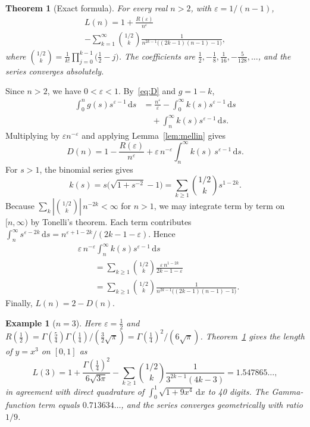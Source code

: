 \documentclass[journal]{IEEEtran}
\newtheorem{theorem}{Theorem}
\newtheorem{example}{Example}
\newcommand{\eps}{\varepsilon}
\newcommand{\dd}{\,\mathrm{d}}
\begin{document}
\begin{theorem}[Exact formula]\label{thm:exact}
For every real $n>2$, with $\eps=1/(n-1)$,
\begin{multline}\label{eq:exact}
  L(n)=1+\frac{R(\eps)}{n^{\eps}}\\
  -\sum_{k=1}^{\infty}\binom{1/2}{k}\frac{1}{n^{2k-1}\bigl((2k-1)(n-1)-1\bigr)},
\end{multline}
where $\binom{1/2}{k}=\frac{1}{k!}\prod_{j=0}^{k-1}\bigl(\frac12-j\bigr)$. The coefficients are
$\frac12,-\frac18,\frac1{16},-\frac5{128},\dots$, and the series converges absolutely.
\end{theorem}

\begin{IEEEproof}
Since $n>2$, we have $0<\eps<1$. By~\eqref{eq:D} and $g=1-k$,
\begin{align*}
  \int_0^ng(s)s^{\eps-1}\dd s&=\frac{n^{\eps}}{\eps}-\int_0^\infty k(s)s^{\eps-1}\dd s\\
  &\quad+\int_n^\infty k(s)s^{\eps-1}\dd s.
\end{align*}
Multiplying by $\eps n^{-\eps}$ and applying Lemma~\ref{lem:mellin} gives
\begin{equation}\label{eq:Dexact}
  D(n)=1-\frac{R(\eps)}{n^{\eps}}+\eps\,n^{-\eps}\int_n^\infty k(s)\,s^{\eps-1}\dd s.
\end{equation}
For $s>1$, the binomial series gives
\[
  k(s)=s\bigl(\sqrt{1+s^{-2}}-1\bigr)=\sum_{k\ge1}\binom{1/2}{k}s^{1-2k}.
\]
Because $\sum_k|\binom{1/2}{k}|\,n^{-2k}<\infty$ for $n>1$, we may integrate term by term on
$[n,\infty)$ by Tonelli's theorem. Each term contributes
$\int_n^\infty s^{\eps-2k}\dd s=n^{\eps+1-2k}/(2k-1-\eps)$. Hence
\begin{align*}
  &\eps\,n^{-\eps}\int_n^\infty k(s)s^{\eps-1}\dd s\\
  &\qquad=\sum_{k\ge1}\binom{1/2}{k}\frac{\eps\,n^{1-2k}}{2k-1-\eps}\\
  &\qquad=\sum_{k\ge1}\binom{1/2}{k}\frac{1}{n^{2k-1}\bigl((2k-1)(n-1)-1\bigr)}.
\end{align*}
Finally, $L(n)=2-D(n)$.
\end{IEEEproof}

\begin{example}[$n=3$]\label{ex:n3}
Here $\eps=\frac12$ and $R(\frac12)=\Gamma(\frac54)\Gamma(\frac14)/(\frac32\sqrt\pi)
=\Gamma(\frac14)^2/(6\sqrt\pi)$. Theorem~\ref{thm:exact} gives the length of $y=x^3$ on
$[0,1]$ as
\[
  L(3)=1+\frac{\Gamma(\frac14)^2}{6\sqrt{3\pi}}-\sum_{k\ge1}\binom{1/2}{k}\frac{1}{3^{2k-1}(4k-3)}
  =1.547865\ldots,
\]
in agreement with direct quadrature of $\int_0^1\sqrt{1+9x^4}\dd x$ to 40 digits. The
Gamma-function term equals $0.713634\ldots$, and the series converges geometrically with
ratio $1/9$.
\end{example}
\end{document}
